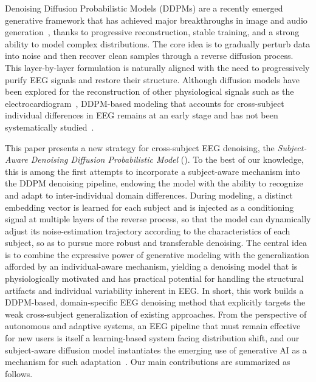 Denoising Diffusion Probabilistic Models (DDPMs) are a recently emerged generative framework that has achieved major breakthroughs in image and audio generation~\cite{ho2020ddpm}, thanks to progressive reconstruction, stable training, and a strong ability to model complex distributions. The core idea is to gradually perturb data into noise and then recover clean samples through a reverse diffusion process. This layer-by-layer formulation is naturally aligned with the need to progressively purify EEG signals and restore their structure. Although diffusion models have been explored for the reconstruction of other physiological signals such as the electrocardiogram~\cite{zhao2023ecg,goldberger2000physionet}, DDPM-based modeling that accounts for cross-subject individual differences in EEG remains at an early stage and has not been systematically studied~\cite{zeng2023dmre2i}.

This paper presents a new strategy for cross-subject EEG denoising, the \emph{Subject-Aware Denoising Diffusion Probabilistic Model} (\saddpm{}). To the best of our knowledge, this is among the first attempts to incorporate a subject-aware mechanism into the DDPM denoising pipeline, endowing the model with the ability to recognize and adapt to inter-individual domain differences. During modeling, a distinct embedding vector is learned for each subject and is injected as a conditioning signal at multiple layers of the reverse process, so that the model can dynamically adjust its noise-estimation trajectory according to the characteristics of each subject, so as to pursue more robust and transferable denoising. The central idea is to combine the expressive power of generative modeling with the generalization afforded by an individual-aware mechanism, yielding a denoising model that is physiologically motivated and has practical potential for handling the structural artifacts and individual variability inherent in EEG. In short, this work builds a DDPM-based, domain-specific EEG denoising method that explicitly targets the weak cross-subject generalization of existing approaches. From the perspective of autonomous and adaptive systems, an EEG pipeline that must remain effective for new users is itself a learning-based system facing distribution shift, and our subject-aware diffusion model instantiates the emerging use of generative AI as a mechanism for such adaptation~\cite{li2024genai,casimiro2024selfadapting}. Our main contributions are summarized as follows.

